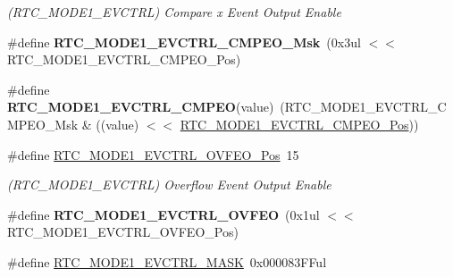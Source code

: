 \begin{DoxyCompactItemize}
\begin{DoxyCompactList}\small\item\em (R\+T\+C\+\_\+\+M\+O\+D\+E1\+\_\+\+E\+V\+C\+T\+R\+L) Compare x Event Output Enable \end{DoxyCompactList}\item 
\hypertarget{group___s_a_m_l21___r_t_c_gafcb84f65fdf444323b0b9ba698b79cb7}{}\#define {\bfseries R\+T\+C\+\_\+\+M\+O\+D\+E1\+\_\+\+E\+V\+C\+T\+R\+L\+\_\+\+C\+M\+P\+E\+O\+\_\+\+Msk}~(0x3ul $<$$<$ R\+T\+C\+\_\+\+M\+O\+D\+E1\+\_\+\+E\+V\+C\+T\+R\+L\+\_\+\+C\+M\+P\+E\+O\+\_\+\+Pos)\label{group___s_a_m_l21___r_t_c_gafcb84f65fdf444323b0b9ba698b79cb7}

\item 
\hypertarget{group___s_a_m_l21___r_t_c_gad64d755d373669d26812b22370aa82f6}{}\#define {\bfseries R\+T\+C\+\_\+\+M\+O\+D\+E1\+\_\+\+E\+V\+C\+T\+R\+L\+\_\+\+C\+M\+P\+E\+O}(value)~(R\+T\+C\+\_\+\+M\+O\+D\+E1\+\_\+\+E\+V\+C\+T\+R\+L\+\_\+\+C\+M\+P\+E\+O\+\_\+\+Msk \& ((value) $<$$<$ \hyperlink{group___s_a_m_l21___r_t_c_ga0a18e318546dc40f49df011fda9bf956}{R\+T\+C\+\_\+\+M\+O\+D\+E1\+\_\+\+E\+V\+C\+T\+R\+L\+\_\+\+C\+M\+P\+E\+O\+\_\+\+Pos}))\label{group___s_a_m_l21___r_t_c_gad64d755d373669d26812b22370aa82f6}

\item 
\hypertarget{group___s_a_m_l21___r_t_c_gae9ab53a64c0bfddd3ba7335924f24ee1}{}\#define \hyperlink{group___s_a_m_l21___r_t_c_gae9ab53a64c0bfddd3ba7335924f24ee1}{R\+T\+C\+\_\+\+M\+O\+D\+E1\+\_\+\+E\+V\+C\+T\+R\+L\+\_\+\+O\+V\+F\+E\+O\+\_\+\+Pos}~15\label{group___s_a_m_l21___r_t_c_gae9ab53a64c0bfddd3ba7335924f24ee1}

\begin{DoxyCompactList}\small\item\em (R\+T\+C\+\_\+\+M\+O\+D\+E1\+\_\+\+E\+V\+C\+T\+R\+L) Overflow Event Output Enable \end{DoxyCompactList}\item 
\hypertarget{group___s_a_m_l21___r_t_c_ga706a4958d0f71e3dd3f3388788da405a}{}\#define {\bfseries R\+T\+C\+\_\+\+M\+O\+D\+E1\+\_\+\+E\+V\+C\+T\+R\+L\+\_\+\+O\+V\+F\+E\+O}~(0x1ul $<$$<$ R\+T\+C\+\_\+\+M\+O\+D\+E1\+\_\+\+E\+V\+C\+T\+R\+L\+\_\+\+O\+V\+F\+E\+O\+\_\+\+Pos)\label{group___s_a_m_l21___r_t_c_ga706a4958d0f71e3dd3f3388788da405a}

\item 
\hypertarget{group___s_a_m_l21___r_t_c_gab39a5da7f43427780e0b385964770e6c}{}\#define \hyperlink{group___s_a_m_l21___r_t_c_gab39a5da7f43427780e0b385964770e6c}{R\+T\+C\+\_\+\+M\+O\+D\+E1\+\_\+\+E\+V\+C\+T\+R\+L\+\_\+\+M\+A\+S\+K}~0x000083\+F\+Ful\label{group___s_a_m_l21___r_t_c_gab39a5da7f43427780e0b385964770e6c}


\end{DoxyCompactItemize}
